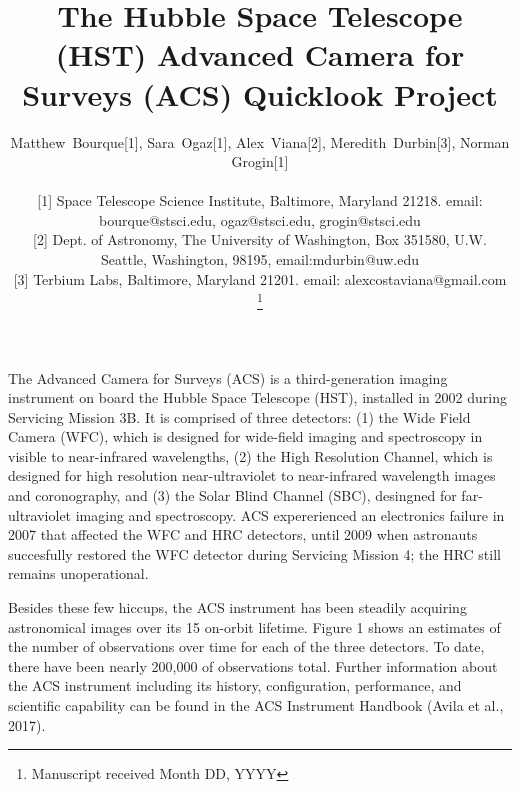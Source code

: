 \documentclass[10pt,journal,compsoc]{IEEEtran}
\begin{document}
\title{The Hubble Space Telescope (HST) Advanced Camera for Surveys (ACS) Quicklook Project}

\author{Matthew~Bourque[1], Sara~Ogaz[1], Alex~Viana[2], Meredith~Durbin[3], Norman Grogin[1]\\
\begin{flushleft}
{\scriptsize [1] Space Telescope Science Institute, Baltimore, Maryland 21218. email: bourque@stsci.edu, ogaz@stsci.edu, grogin@stsci.edu}\\
{\scriptsize [2] Dept. of Astronomy, The University of Washington, Box 351580, U.W. Seattle, Washington, 98195, email:mdurbin@uw.edu}\\
{\scriptsize [3] Terbium Labs, Baltimore, Maryland 21201. email: alexcostaviana@gmail.com}
\end{flushleft}
\thanks{Manuscript received Month DD, YYYY}}



\maketitle
\IEEEdisplaynontitleabstractindextext
\IEEEpeerreviewmaketitle


The Advanced Camera for Surveys (ACS) is a third-generation imaging
instrument on board the Hubble Space Telescope (HST), installed in 2002 during
Servicing Mission 3B. It is comprised of three detectors: (1) the Wide Field Camera
(WFC), which is designed for wide-field imaging and spectroscopy in visible to
near-infrared wavelengths, (2) the High Resolution Channel, which is designed for
high resolution near-ultraviolet to near-infrared wavelength images and coronography,
and (3) the Solar Blind Channel (SBC), desingned for far-ultraviolet imaging and
spectroscopy.  ACS expererienced an electronics failure in 2007 that affected
the WFC and HRC detectors, until 2009 when astronauts succesfully restored the WFC
detector during Servicing Mission 4; the HRC still remains unoperational.

Besides these few hiccups, the ACS instrument has been steadily acquiring astronomical
images over its 15 on-orbit lifetime.  Figure 1 shows an estimates of the number of
observations over time for each of the three detectors.  To date, there have been
nearly 200,000 of observations total.  Further information about the ACS instrument
including its history, configuration, performance, and scientific capability can be
found in the ACS Instrument Handbook (Avila et al., 2017).
\end{document}
